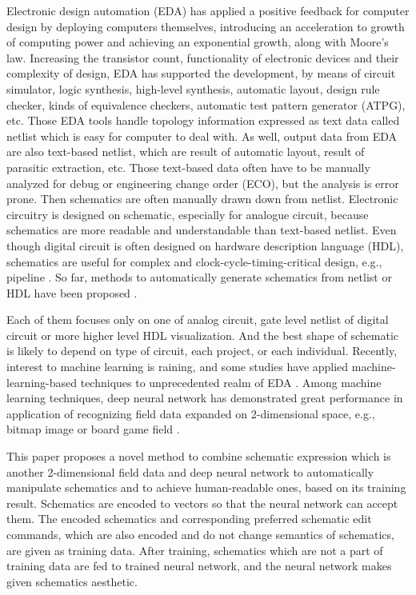 \documentclass[twocolumn]{article}
\begin{document}
Electronic design automation (EDA) has applied a positive feedback
for computer design by deploying computers themselves,
introducing an acceleration to growth of computing power
and achieving an exponential growth, along with Moore's law.
Increasing the transistor count,
functionality of electronic devices and their complexity of design,
EDA has supported the development, by means of circuit simulator,
logic synthesis, high-level synthesis, automatic layout,
design rule checker, kinds of equivalence checkers,
automatic test pattern generator (ATPG), etc.
Those EDA tools handle topology information expressed as text data
called netlist which is easy for computer to deal with.
As well, output data from EDA are also text-based netlist,
which are result of automatic layout, result of parasitic extraction, etc.
Those text-based data often have to be manually analyzed
for debug or engineering change order (ECO),
but the analysis is error prone.
Then schematics are often manually drawn down from netlist.
Electronic circuitry is designed on schematic,
especially for analogue circuit,
because schematics are more readable and understandable
than text-based netlist.
Even though digital circuit is often designed
on hardware description language (HDL),
schematics are useful for complex and clock-cycle-timing-critical design,
e.g., pipeline \cite{ph}.
So far, methods to automatically generate schematics from netlist or HDL
have been proposed
\cite{nauts}
\cite{anshul}
\cite{fiduccia}
\cite{chun}
\cite{green}
\cite{tsung}
\cite{bogdan}.

Each of them focuses only on one of analog circuit,
gate level netlist of digital circuit
or more higher level HDL visualization.
And the best shape of schematic is likely to depend on
type of circuit, each project, or each individual.
Recently, interest to machine learning is raining,
and some studies have applied machine-learning-based techniques
to unprecedented realm of EDA \cite{fan} \cite{sourav}.
Among machine learning techniques,
deep neural network has demonstrated great performance
in application of recognizing field data
expanded on 2-dimensional space,
e.g., bitmap image or board game field \cite{nips} \cite{alphago}.

This paper proposes a novel method to combine schematic expression
which is another 2-dimensional field data
and deep neural network to automatically manipulate schematics
and to achieve human-readable ones, based on its training result.
Schematics are encoded to vectors so that the neural network can accept them.
The encoded schematics and corresponding preferred schematic edit commands,
which are also encoded and do not change semantics of schematics,
are given as training data.
After training, schematics which are not a part of training data
are fed to trained neural network,
and the neural network makes given schematics aesthetic.
\end{document}
